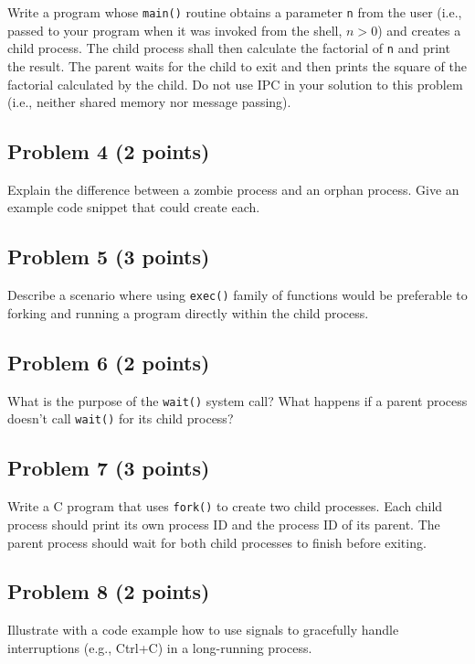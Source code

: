 \documentclass{article}
\begin{document}
Write a program whose \texttt{main()} routine obtains a parameter \texttt{n} from the user (i.e., passed to your program when it was invoked from the shell, $n > 0$) and creates a child process. The child process shall then calculate the factorial of \texttt{n} and print the result. The parent waits for the child to exit and then prints the square of the factorial calculated by the child. Do not use IPC in your solution to this problem (i.e., neither shared memory nor message passing).


\subsection*{Problem 4 (2 points)}

Explain the difference between a zombie process and an orphan process.  Give an example code snippet that could create each.


\subsection*{Problem 5 (3 points)}

Describe a scenario where using \texttt{exec()} family of functions would be preferable to forking and running a program directly within the child process.


\subsection*{Problem 6 (2 points)}

What is the purpose of the \texttt{wait()} system call? What happens if a parent process doesn't call \texttt{wait()} for its child process?


\subsection*{Problem 7 (3 points)}

Write a C program that uses \texttt{fork()} to create two child processes. Each child process should print its own process ID and the process ID of its parent.  The parent process should wait for both child processes to finish before exiting.


\subsection*{Problem 8 (2 points)}

Illustrate with a code example how to use signals to gracefully handle interruptions (e.g., Ctrl+C) in a long-running process.
\end{document}
